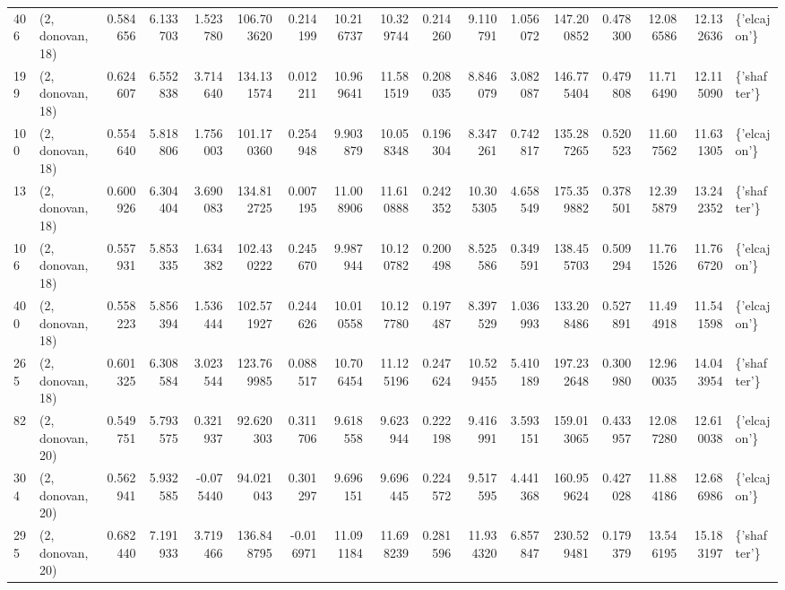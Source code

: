 \begin{tabular}{llrrrrrrrrrrrrrrl}
406 &  (2, donovan, 18) &   0.584656 &   6.133703 &   1.523780 &   106.703620 &   0.214199 &  10.216737 &  10.329744 &  0.214260 &   9.110791 &   1.056072 &   147.200852 &   0.478300 &  12.086586 &  12.132636 &  \{'elcajon'\} \\
199 &  (2, donovan, 18) &   0.624607 &   6.552838 &   3.714640 &   134.131574 &   0.012211 &  10.969641 &  11.581519 &  0.208035 &   8.846079 &   3.082087 &   146.775404 &   0.479808 &  11.716490 &  12.115090 &  \{'shafter'\} \\
100 &  (2, donovan, 18) &   0.554640 &   5.818806 &   1.756003 &   101.170360 &   0.254948 &   9.903879 &  10.058348 &  0.196304 &   8.347261 &   0.742817 &   135.287265 &   0.520523 &  11.607562 &  11.631305 &  \{'elcajon'\} \\
13  &  (2, donovan, 18) &   0.600926 &   6.304404 &   3.690083 &   134.812725 &   0.007195 &  11.008906 &  11.610888 &  0.242352 &  10.305305 &   4.658549 &   175.359882 &   0.378501 &  12.395879 &  13.242352 &  \{'shafter'\} \\
106 &  (2, donovan, 18) &   0.557931 &   5.853335 &   1.634382 &   102.430222 &   0.245670 &   9.987944 &  10.120782 &  0.200498 &   8.525586 &   0.349591 &   138.455703 &   0.509294 &  11.761526 &  11.766720 &  \{'elcajon'\} \\
400 &  (2, donovan, 18) &   0.558223 &   5.856394 &   1.536444 &   102.571927 &   0.244626 &  10.010558 &  10.127780 &  0.197487 &   8.397529 &   1.036993 &   133.208486 &   0.527891 &  11.494918 &  11.541598 &  \{'elcajon'\} \\
265 &  (2, donovan, 18) &   0.601325 &   6.308584 &   3.023544 &   123.769985 &   0.088517 &  10.706454 &  11.125196 &  0.247624 &  10.529455 &   5.410189 &   197.232648 &   0.300980 &  12.960035 &  14.043954 &  \{'shafter'\} \\
82  &  (2, donovan, 20) &   0.549751 &   5.793575 &   0.321937 &    92.620303 &   0.311706 &   9.618558 &   9.623944 &  0.222198 &   9.416991 &   3.593151 &   159.013065 &   0.433957 &  12.087280 &  12.610038 &  \{'elcajon'\} \\
304 &  (2, donovan, 20) &   0.562941 &   5.932585 &  -0.075440 &    94.021043 &   0.301297 &   9.696151 &   9.696445 &  0.224572 &   9.517595 &   4.441368 &   160.959624 &   0.427028 &  11.884186 &  12.686986 &  \{'elcajon'\} \\
295 &  (2, donovan, 20) &   0.682440 &   7.191933 &   3.719466 &   136.848795 &  -0.016971 &  11.091184 &  11.698239 &  0.281596 &  11.934320 &   6.857847 &   230.529481 &   0.179379 &  13.546195 &  15.183197 &  \{'shafter'\} \\

\end{tabular}
